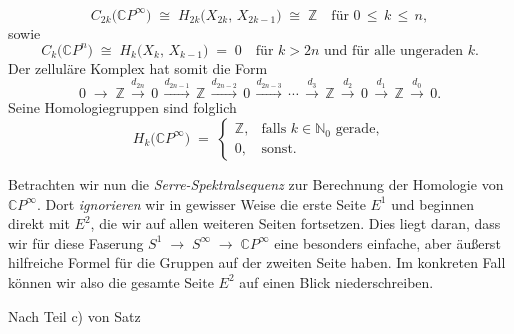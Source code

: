 \documentclass[12pt, hidelinks]{article}
\numberwithin{conj}{section}
\begin{document}
\[
    C_{2k}\bigl(\mathbb{C}P^\infty\bigr)
    \;\cong\;
    H_{2k}\bigl(X_{2k},\,X_{2k-1}\bigr)
    \;\cong\;
    \mathbb{Z}
    \quad
    \text{für }
    0 \,\leq\, k \,\leq\, n,
\]
sowie 
\[
    C_k\bigl(\mathbb{C}P^n\bigr)
    \;\cong\;
    H_k\bigl(X_k,\,X_{k-1}\bigr) 
    \;=\; 0
    \quad
    \text{für }
    k > 2n
    \text{ und für alle ungeraden } k.
\]
Der zelluläre Komplex hat somit die Form
\[
    0 \;\longrightarrow\;
    \mathbb{Z}
    \,\xrightarrow{d_{2n}}\,
    0
    \,\xrightarrow{d_{2n-1}}\,
    \mathbb{Z}
    \,\xrightarrow{d_{2n-2}}\,
    0
    \,\xrightarrow{d_{2n-3}}\,
    \cdots
    \,\xrightarrow{d_{3}}\,
    \mathbb{Z}
    \,\xrightarrow{d_{2}}\,
    0
    \,\xrightarrow{d_{1}}\,
    \mathbb{Z}
    \,\xrightarrow{d_{0}}\,
    0.
\]
Seine Homologiegruppen sind folglich
\[
    H_k\bigl(\mathbb{C}P^\infty\bigr)
    \;=\;
    \begin{cases}
        \mathbb{Z}, &\text{falls } k \in \mathbb{N}_0 \text{ gerade},\\
        0, &\text{sonst}.
    \end{cases}
\]

\smallskip

Betrachten wir nun die \emph{Serre-Spektralsequenz} zur Berechnung der Homologie von \(\mathbb{C}P^\infty\). Dort \emph{ignorieren} wir in gewisser Weise die erste Seite \(E^1\) und beginnen direkt mit \(E^2\), die wir auf allen weiteren Seiten fortsetzen. Dies liegt daran, dass wir für diese Faserung \(
    S^1 \;\longrightarrow\; S^\infty \;\longrightarrow\; \mathbb{C}P^\infty
\)
eine besonders einfache, aber äußerst hilfreiche Formel für die Gruppen auf der zweiten Seite haben. Im konkreten Fall können wir also die gesamte Seite \(E^2\) auf einen Blick niederschreiben.





Nach Teil c) von Satz 
\nocite{*}
\printbibliography
\end{document}
